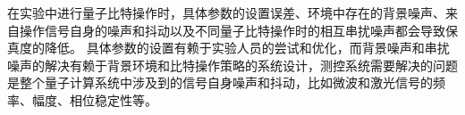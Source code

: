 
在实验中进行量子比特操作时，具体参数的设置误差、环境中存在的背景噪声、来自操作信号自身的噪声和抖动以及不同量子比特操作时的相互串扰噪声都会导致保真度的降低。
具体参数的设置有赖于实验人员的尝试和优化，而背景噪声和串扰噪声的解决有赖于背景环境和比特操作策略的系统设计，测控系统需要解决的问题是整个量子计算系统中涉及到的信号自身噪声和抖动，比如微波和激光信号的频率、幅度、相位稳定性等。

